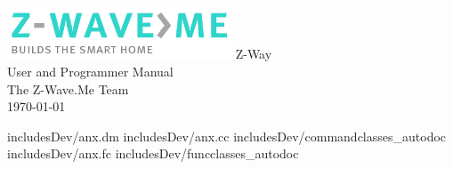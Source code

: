 \documentclass[10pt, pointlessnumbers, twoside=false, normalheadings]{scrbook}
\begin{document}
\begin{titlepage}
\begin{center}
	\includegraphics[width=0.5\textwidth]{pngs/z-wave.me-logo.png}
	\vspace{10mm}
	\Huge{Z-Way}\\
	\vspace{10mm}
	\LARGE{User and Programmer Manual}\\
	\vspace{\fill}	
	\large{The Z-Wave.Me Team}\\
	\large{\today}
\end{center}
\end{titlepage}
		

\newpage{}
\tableofcontents
 
 
 
 
 
 
 







\begin{appendix} 
 {includesDev/anx.dm}
 {includesDev/anx.cc}
 {includesDev/commandclasses_autodoc}
 {includesDev/anx.fc}
 {includesDev/funcclasses_autodoc}
 
\end{appendix} 

\listoftables
\listoffigures
\printindex
\end{document}
